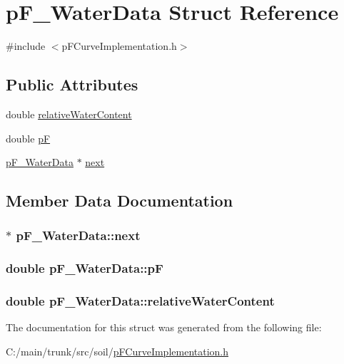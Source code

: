 \hypertarget{structp_f___water_data}{
\section{pF\_\-WaterData Struct Reference}
\label{structp_f___water_data}
}


{\ttfamily \#include $<$pFCurveImplementation.h$>$}\subsection*{Public Attributes}
\begin{DoxyCompactItemize}
\item 
double \hyperlink{structp_f___water_data_a4b8b55db03e629482a0ca3d9582f47b5}{relativeWaterContent}
\item 
double \hyperlink{structp_f___water_data_a089007e67b40704f5b2920591d66f8b2}{pF}
\item 
\hyperlink{structp_f___water_data}{pF\_\-WaterData} $\ast$ \hyperlink{structp_f___water_data_a9f167a6cef0116adcfdb66243d3ba12c}{next}
\end{DoxyCompactItemize}


\subsection{Member Data Documentation}
\hypertarget{structp_f___water_data_a9f167a6cef0116adcfdb66243d3ba12c}{
\subsubsection[{next}]{$\ast$ {\bf pF\_\-WaterData::next}}}
\label{structp_f___water_data_a9f167a6cef0116adcfdb66243d3ba12c}
\hypertarget{structp_f___water_data_a089007e67b40704f5b2920591d66f8b2}{
\subsubsection[{pF}]{\setlength{\rightskip}{0pt plus 5cm}double {\bf pF\_\-WaterData::pF}}}
\label{structp_f___water_data_a089007e67b40704f5b2920591d66f8b2}
\hypertarget{structp_f___water_data_a4b8b55db03e629482a0ca3d9582f47b5}{
\subsubsection[{relativeWaterContent}]{\setlength{\rightskip}{0pt plus 5cm}double {\bf pF\_\-WaterData::relativeWaterContent}}}
\label{structp_f___water_data_a4b8b55db03e629482a0ca3d9582f47b5}


The documentation for this struct was generated from the following file:\begin{DoxyCompactItemize}
\item 
C:/main/trunk/src/soil/\hyperlink{p_f_curve_implementation_8h}{pFCurveImplementation.h}\end{DoxyCompactItemize}
